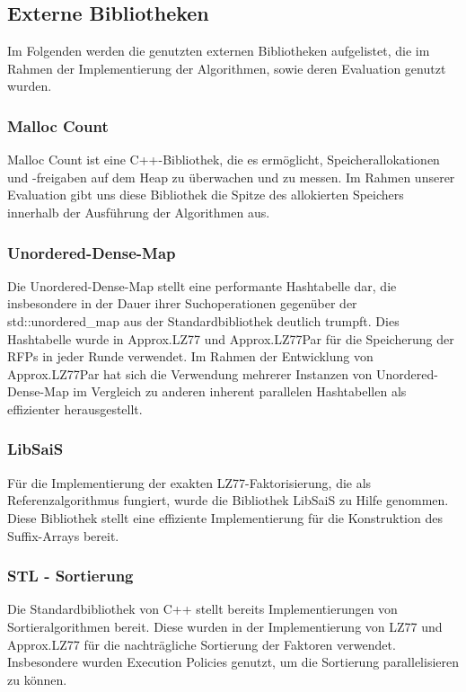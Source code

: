 \subsection{Externe Bibliotheken}
Im Folgenden werden die genutzten externen Bibliotheken aufgelistet, die im Rahmen der Implementierung der Algorithmen, sowie deren Evaluation genutzt wurden.
\subsubsection{Malloc Count} \label{malloccount}
Malloc Count \cite{malloc_count} ist eine C++-Bibliothek, die es ermöglicht, Speicherallokationen und -freigaben auf dem Heap zu überwachen und zu messen. Im
Rahmen unserer Evaluation gibt uns diese Bibliothek die Spitze des allokierten Speichers innerhalb der Ausführung der Algorithmen aus.

\subsubsection{Unordered-Dense-Map} \label{unordereddense}
Die Unordered-Dense-Map \cite{unordered_dense} stellt eine performante Hashtabelle dar, die insbesondere in der Dauer ihrer Suchoperationen gegenüber
der std::unordered\_map aus der Standardbibliothek deutlich trumpft. Dies Hashtabelle wurde in Approx.LZ77 und Approx.LZ77Par für die Speicherung der
RFPs in jeder Runde verwendet. Im Rahmen der Entwicklung von Approx.LZ77Par hat sich die Verwendung mehrerer Instanzen von Unordered-Dense-Map im Vergleich
zu anderen inherent parallelen Hashtabellen \cite{oneapi} \cite{sharded_map} als effizienter herausgestellt.

\subsubsection{LibSaiS}
Für die Implementierung der exakten LZ77-Faktorisierung, die als Referenzalgorithmus fungiert, wurde die Bibliothek LibSaiS \cite{libsais} zu Hilfe genommen. Diese
Bibliothek stellt eine effiziente Implementierung für die Konstruktion des Suffix-Arrays bereit.

\subsubsection{STL - Sortierung}
Die Standardbibliothek von C++ stellt bereits Implementierungen von Sortieralgorithmen bereit. Diese wurden in der Implementierung von LZ77 und Approx.LZ77 für
die nachträgliche Sortierung der Faktoren verwendet. Insbesondere wurden Execution Policies \cite{execpol} genutzt, um die Sortierung parallelisieren zu können.


